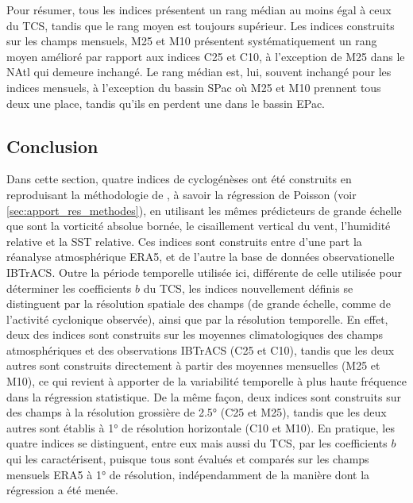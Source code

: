 \documentclass[../main.tex]{subfiles}
\begin{document}
Pour résumer, tous les indices présentent un rang médian au moins égal à ceux du TCS, tandis que le rang moyen est toujours supérieur. Les indices construits
sur les champs mensuels, M25 et M10 présentent systématiquement un rang moyen amélioré par rapport aux indices C25 et C10, à l'exception de M25 dans le NAtl qui
demeure inchangé. Le rang médian est, lui, souvent inchangé pour les indices mensuels, à l'exception du bassin SPac où M25 et M10 prennent tous deux une place,
tandis qu'ils en perdent une dans le bassin EPac.

\subsection{Conclusion}

Dans cette section, quatre indices de cyclogénèses ont été construits en reproduisant la méthodologie de \textcite{tippett_poisson_2011}, à savoir la régression
de Poisson (voir \cref{sec:apport_res_methodes}), en utilisant les mêmes prédicteurs de grande échelle que sont la vorticité absolue bornée, le cisaillement
vertical du vent, l'humidité relative et la SST relative. Ces indices sont construits entre d'une part la réanalyse atmosphérique ERA5, et de l'autre la base de
données observationelle IBTrACS. Outre la période temporelle utilisée ici, différente de celle utilisée pour déterminer les coefficients $b$ du TCS, les indices
nouvellement définis se distinguent par la résolution spatiale des champs (de grande échelle, comme de l'activité cyclonique observée), ainsi que par la
résolution temporelle. En effet, deux des indices sont construits sur les moyennes climatologiques des champs atmosphériques et des observations IBTrACS (C25 et
C10), tandis que les deux autres sont construits directement à partir des moyennes mensuelles (M25 et M10), ce qui revient à apporter de la variabilité
temporelle à plus haute fréquence dans la régression statistique. De la même façon, deux indices sont construits sur des champs à la résolution grossière de
\ang{2.5} (C25 et M25), tandis que les deux autres sont établis à \ang{1} de résolution horizontale (C10 et M10). En pratique, les quatre indices se
distinguent, entre eux mais aussi du TCS, par les coefficients $b$ qui les caractérisent, puisque tous sont évalués et comparés sur les champs mensuels ERA5 à
\ang{1} de résolution, indépendamment de la manière dont la régression a été menée.
\end{document}
